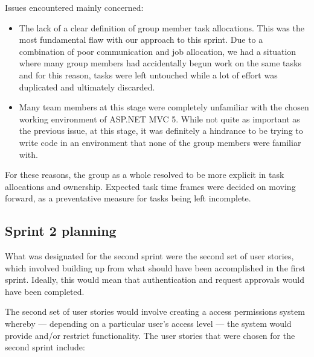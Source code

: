 \documentclass[a4paper,titlepage,12pt]{article}
\begin{document}
Issues encountered mainly concerned:

\begin{itemize}
	\item The lack of a clear definition of group member task allocations.
	      This was the most fundamental flaw with our approach to this
	      sprint. Due to a combination of poor communication and job
	      allocation, we had a situation where many group members had
	      accidentally begun work on the same tasks and for this reason,
	      tasks were left untouched while a lot of effort was duplicated
	      and ultimately discarded.
	\item Many team members at this stage were completely unfamiliar with
	      the chosen working environment of ASP.NET MVC 5.
	      While not quite as important as the previous issue, at this
	      stage, it was definitely a hindrance to be trying to write code
	      in an environment that none of the group members were familiar
	      with.
\end{itemize}

For these reasons, the group as a whole resolved to be more explicit in task
allocations and ownership. Expected task time frames were decided on moving
forward, as a preventative measure for tasks being left incomplete.

\subsection{Sprint 2 planning}

What was designated for the second sprint were the second set of user stories,
which involved building up from what should have been accomplished in the first
sprint. Ideally, this would mean that authentication and request approvals
would have been completed.

The second set of user stories would involve creating a access permissions
system whereby --- depending on a particular user's access level --- the system
would provide and/or restrict functionality. The user stories that were chosen
for the second sprint include:
\end{document}
